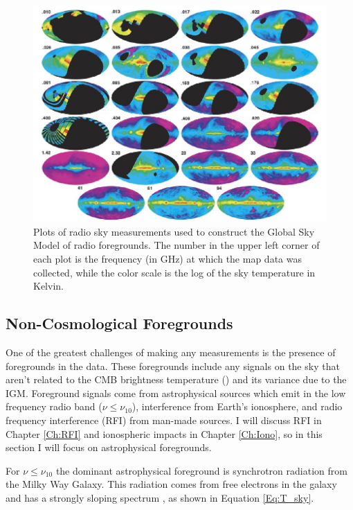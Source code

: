\begin{figure}[htb]
\begin{center}
\includegraphics[width=0.95\linewidth]{Introduction/figures/GSM_maps.jpg}
\caption{Plots of radio sky measurements used to construct the Global Sky Model \cite{GSM_model} of radio foregrounds. The number in the upper left corner of each plot is the frequency (in GHz) at which the map data was collected, while the color scale is the log of the sky temperature in Kelvin.}
\label{Fig:GSM_maps}
\end{center}
\end{figure}

\subsection{Non-Cosmological Foregrounds}
One of the greatest challenges of making any \cm measurements is the presence of foregrounds in the data. These foregrounds include any signals on the sky that aren't related to the CMB brightness temperature (\tb) and its variance due to the IGM. Foreground signals come from astrophysical sources which emit in the low frequency radio band ($\nu \leq \nu_{10}$), interference from Earth's ionosphere, and radio frequency interference (RFI) from man-made sources. I will discuss RFI in Chapter \ref{Ch:RFI} and ionospheric impacts in Chapter \ref{Ch:Iono}, so in this section I will focus on astrophysical foregrounds. 

For $\nu \leq \nu_{10}$ the dominant astrophysical foreground is synchrotron radiation from the Milky Way Galaxy. This radiation comes from free electrons in the galaxy and has a strongly sloping spectrum \cite{furlanetto_2006}, as shown in Equation \ref{Eq:T_sky}. 

